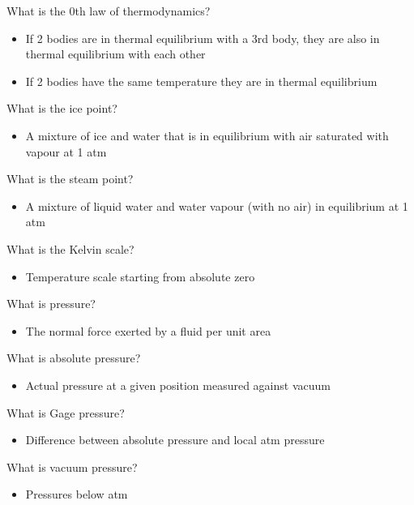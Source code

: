 \documentclass[class=report, crop=false, 12pt,a4paper]{standalone}
\begin{document}
What is the 0th law of thermodynamics?
\begin{itemize}
  \item If 2 bodies are in thermal equilibrium with a 3rd body, they are also in thermal equilibrium with each other
  \item If 2 bodies have the same temperature they are in thermal equilibrium
\end{itemize}

What is the ice point?
\begin{itemize}
  \item A mixture of ice and water that is in equilibrium with air saturated with vapour at 1 atm
\end{itemize}

What is the steam point?
\begin{itemize}
  \item A mixture of liquid water and water vapour (with no air) in equilibrium at 1 atm
\end{itemize}

What is the Kelvin scale?
\begin{itemize}
  \item Temperature scale starting from absolute zero
\end{itemize}

What is pressure?
\begin{itemize}
  \item The normal force exerted by a fluid per unit area
\end{itemize}

What is absolute pressure?
\begin{itemize}
  \item Actual pressure at a given position measured against vacuum
\end{itemize}

What is Gage pressure?
\begin{itemize}
  \item Difference between absolute pressure and local atm pressure
\end{itemize}

What is vacuum pressure?
\begin{itemize}
  \item Pressures below atm
\end{itemize}
\end{document}
